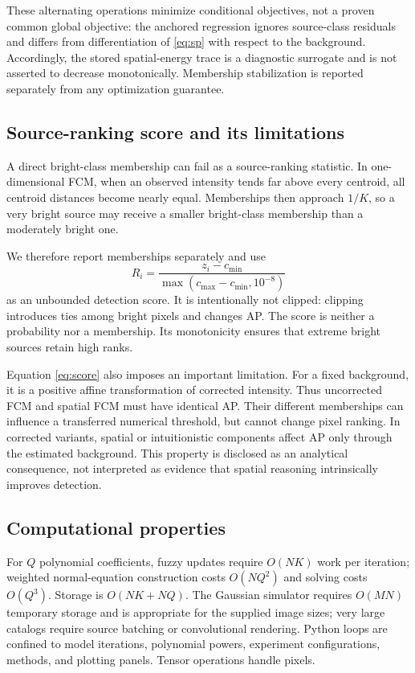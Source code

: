\documentclass[conference]{IEEEtran}
\begin{document}
These alternating operations minimize conditional objectives, not a proven common global objective: the anchored regression ignores source-class residuals and differs from differentiation of \eqref{eq:sp} with respect to the background. Accordingly, the stored spatial-energy trace is a diagnostic surrogate and is not asserted to decrease monotonically. Membership stabilization is reported separately from any optimization guarantee.

\subsection{Source-ranking score and its limitations}
A direct bright-class membership can fail as a source-ranking statistic. In one-dimensional FCM, when an observed intensity tends far above every centroid, all centroid distances become nearly equal. Memberships then approach $1/K$, so a very bright source may receive a smaller bright-class membership than a moderately bright one.

We therefore report memberships separately and use
\begin{equation}
 R_i=\frac{z_i-c_{\min}}{\max(c_{\max}-c_{\min},10^{-8})}\label{eq:score}
\end{equation}
as an unbounded detection score. It is intentionally not clipped: clipping introduces ties among bright pixels and changes AP. The score is neither a probability nor a membership. Its monotonicity ensures that extreme bright sources retain high ranks.

Equation \eqref{eq:score} also imposes an important limitation. For a fixed background, it is a positive affine transformation of corrected intensity. Thus uncorrected FCM and spatial FCM must have identical AP. Their different memberships can influence a transferred numerical threshold, but cannot change pixel ranking. In corrected variants, spatial or intuitionistic components affect AP only through the estimated background. This property is disclosed as an analytical consequence, not interpreted as evidence that spatial reasoning intrinsically improves detection.

\subsection{Computational properties}
For $Q$ polynomial coefficients, fuzzy updates require $O(NK)$ work per iteration; weighted normal-equation construction costs $O(NQ^2)$ and solving costs $O(Q^3)$. Storage is $O(NK+NQ)$. The Gaussian simulator requires $O(MN)$ temporary storage and is appropriate for the supplied image sizes; very large catalogs require source batching or convolutional rendering. Python loops are confined to model iterations, polynomial powers, experiment configurations, methods, and plotting panels. Tensor operations handle pixels.
\end{document}
